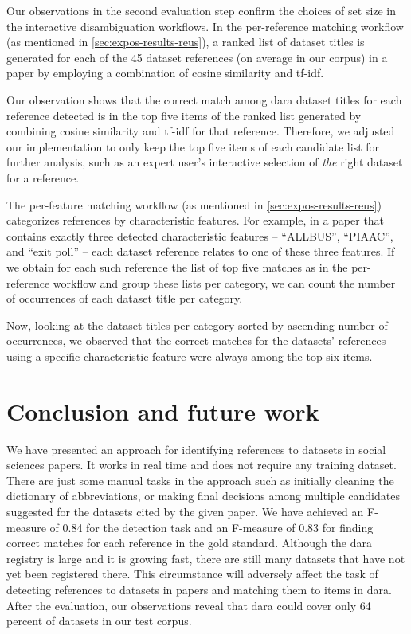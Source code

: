 \documentclass{IOS-Book-Article}
\newcommand{\dara}{\textsf{da\textbar ra}}
\begin{document}
Our observations in the second evaluation step confirm the choices of set size in the interactive disambiguation workflows. In the per-reference matching workflow (as mentioned in \ref{sec:expos-results-reus}), a ranked list of dataset titles is generated for each of the 45 dataset references (on average in our corpus) in a paper by employing a combination of cosine similarity and tf-idf. 
 
Our observation shows that the correct match among {\dara} dataset titles for each reference detected is in the top five items of the ranked list generated by combining cosine similarity and tf-idf for that reference. Therefore, we adjusted our implementation to only keep the top five items of each candidate list for further analysis, such as an expert user's interactive selection of \emph{the} right dataset for a reference.
 
The per-feature matching workflow (as mentioned in \ref{sec:expos-results-reus}) categorizes references by characteristic features. For example, in a paper that contains exactly three detected characteristic features -- \enquote{ALLBUS}, \enquote{PIAAC}, and \enquote{exit poll} -- each dataset reference relates to one of these three features. If we obtain for each such reference the list of top five matches as in the per-reference workflow and group these lists per category, we can count the number of occurrences of each dataset title per category. 
 
Now, looking at the dataset titles per category sorted by ascending number of occurrences, we observed that the correct matches for the datasets' references using a specific characteristic feature were always among the top six items.
 
\section{Conclusion and future work}
\label{sec:future}
We have presented an approach for identifying references to datasets in social sciences papers.
It works in real time and does not require any training dataset.
There are just some manual tasks in the approach such as initially cleaning the dictionary of abbreviations, or making final decisions among multiple candidates suggested for the datasets cited by the given paper.
We have achieved an F-measure of 0.84 for the detection task and an F-measure of 0.83 for finding correct matches for each reference in the gold standard.  
Although the {\dara} registry is large and it is growing fast, there are still many datasets that have not yet been registered there. 
This circumstance will adversely affect the task of detecting references to datasets in papers and matching them to items in {\dara}.
After the evaluation, our observations reveal that {\dara} could cover only 64 percent of datasets in our test corpus. 
\end{document}
